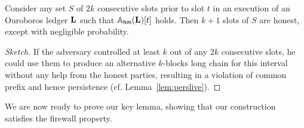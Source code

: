 \begin{lemma}\label{lem:honest-subsequence}
  Consider any set $S$ of $2k$ consecutive slots prior to slot $t$ in an
  execution of an Ouroboros ledger $\mathbf{L}$ such that %
  $\mathbb{A}_{\mathsf{hm}}(\mathbf{L})[t]$ holds. Then $k + 1$ slots of $S$ are honest, except
  with negligible probability.
\end{lemma}
\begin{proof}[Sketch]
  If the adversary controlled at least $k$ out of any $2k$ consecutive slots, he
  could use them to produce an alternative $k$-blocks long chain for this
  interval without any help from the honest parties, resulting in a violation of
  common prefix and hence persistence (cf. Lemma~\ref{lem:perslive}).
\end{proof}

We are now ready to prove our key lemma, showing that our
construction satisfies the firewall property.

